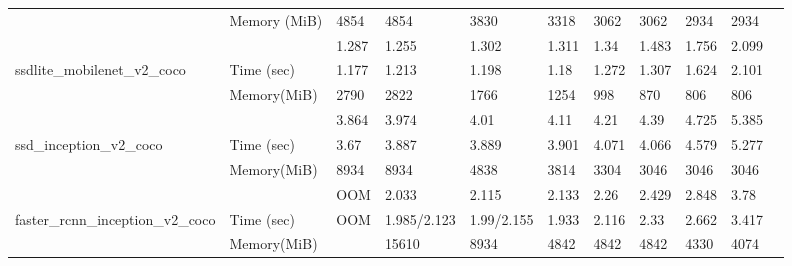 \documentclass[conference]{IEEEtran}
\begin{document}
\begin{table}[]
{\begin{tabular}{lllllllllll}
                                                                & Memory (MiB)  & 4854                & 4854               & 3830              & 3318              & 3062             & 3062   & 2934              & 2934        &          \\
                                                                &               & 1.287               & 1.255              & 1.302             & 1.311             & 1.34             & 1.483  & 1.756             & 2.099       &          \\
ssdlite\_mobilenet\_v2\_coco                                    & Time (sec)    & 1.177               & 1.213              & 1.198             & 1.18              & 1.272            & 1.307  & 1.624             & 2.101       &          \\
                                                                & Memory(MiB)   & 2790                & 2822               & 1766              & 1254              & 998              & 870    & 806               & 806         &          \\
                                                                &               & 3.864               & 3.974              & 4.01              & 4.11              & 4.21             & 4.39   & 4.725             & 5.385       &          \\
ssd\_inception\_v2\_coco                                        & Time (sec)    & 3.67                & 3.887              & 3.889             & 3.901             & 4.071            & 4.066  & 4.579             & 5.277       &          \\
                                                                & Memory(MiB)   & 8934                & 8934               & 4838              & 3814              & 3304             & 3046   & 3046              & 3046        &          \\
                                                                &               & OOM                 & 2.033              & 2.115             & 2.133             & 2.26             & 2.429  & 2.848             & 3.78        &          \\
faster\_rcnn\_inception\_v2\_coco                               & Time (sec)    & OOM                 & 1.985/2.123        & 1.99/2.155        & 1.933             & 2.116            & 2.33   & 2.662             & 3.417       &          \\
                                                                & Memory(MiB)   &                     & 15610              & 8934              & 4842              & 4842             & 4842   & 4330              & 4074        &          \\

\end{tabular}}
\end{table}
\end{document}
